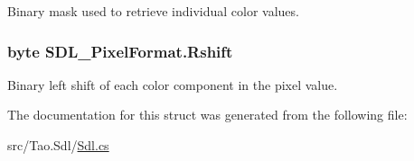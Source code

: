 Binary mask used to retrieve individual color values. 

\hypertarget{struct_s_d_l___pixel_format_a260fab59a09c90b1a4ee2a581a88c1c9}{
\subsubsection[{Rshift}]{\setlength{\rightskip}{0pt plus 5cm}byte {\bf SDL\_\-PixelFormat.Rshift}}}
\label{struct_s_d_l___pixel_format_a260fab59a09c90b1a4ee2a581a88c1c9}


Binary left shift of each color component in the pixel value. 



The documentation for this struct was generated from the following file:\begin{DoxyCompactItemize}
\item 
src/Tao.Sdl/\hyperlink{_sdl_8cs}{Sdl.cs}\end{DoxyCompactItemize}
